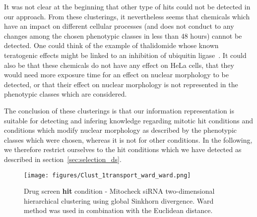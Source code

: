 It was not clear at the beginning that other type of hits could not be detected in our approach. From these clusterings, it nevertheless seems that chemicals which have an impact on different cellular processes (and does not conduct to any changes among the chosen phenotypic classes in less than 48 hours) cannot be detected. One could think of the example of thalidomide whose known teratogenic effects might be linked to an inhibition of ubiquitin ligase~\cite{pmid20223979}. It could also be that these chemicals do not have any effect on HeLa cells, that they would need more exposure time for an effect on nuclear morphology to be detected, or that their effect on nuclear morphology is not represented in the phenotypic classes which are considered.

The conclusion of these clusterings is that our information representation is suitable for detecting and infering knowledge regarding mitotic hit conditions and conditions which modify nuclear morphology as described by the phenotypic classes which were chosen, whereas it is not for other conditions. In the following, we therefore restrict ourselves to the hit conditions which we have detected as described in section~\ref{sec:selection_ds}.
%

\begin{figure*}[ht!]
\centerline{\texttt{[image: figures/Clust\_1transport\_ward\_ward.png]}}
\caption{Drug screen \textbf{hit} condition - Mitocheck siRNA two-dimensional hierarchical clustering using global Sinkhorn divergence. Ward method was used in combination with the Euclidean distance.}
\label{hitcond_clust_transport}
\end{figure*}

